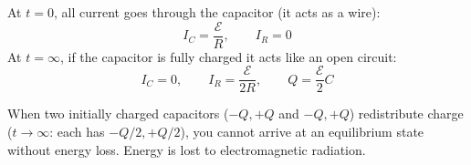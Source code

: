 \begin{example}
At $t=0$, all current goes through the capacitor (it acts as a wire):
\[
    I_C = \frac{\mathcal{E}}{R}, \qquad I_R = 0
\]
At $t=\infty$, if the capacitor is fully charged it acts like an open circuit:
\[
    I_C = 0, \qquad I_R = \frac{\mathcal{E}}{2R}, \qquad Q = \frac{\mathcal{E}}{2}C
\]
\end{example}

\begin{fact}
When two initially charged capacitors ($-Q,+Q$ and $-Q,+Q$) redistribute charge ($t\to\infty$: each has $-Q/2,+Q/2$), you cannot arrive at an equilibrium state without energy loss. Energy is lost to electromagnetic radiation.
\end{fact}

